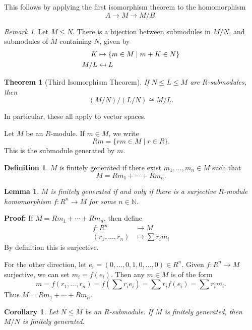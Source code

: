 \documentclass[12pt]{article}
\newtheorem{theorem}{Theorem}[section]
\newtheorem{corollary}{Corollary}[section]
\newtheorem{lemma}{Lemma}[section]
\theoremstyle{definition}
\newtheorem{definition}{Definition}[section]
\theoremstyle{remark}
\newtheorem*{remark}{Remark}
\newcommand{\mapsfrom}{\mathrel{\reflectbox{\ensuremath{\mapsto}}}}
\begin{document}
This follows by applying the first isomorphism theorem to the homomorphism
\[
A \to M \to M/B
.\]

\begin{remark}
	Let $M \leq N$. There is a bijection between submodules in $M/N$, and submodules of $M$ containing $N$, given by
	\begin{align*}
		K &\mapsto \{m \in M \mid m + K \in N\} \\
			M/L &\mapsfrom L
		\end{align*}
\end{remark}

\begin{theorem}[Third Isomorphism Theorem]
	If $N \leq L \leq M$ are $R$-submodules, then
	\[
		(M/N)/(L/N) \cong M/L
	.\]
\end{theorem}

In particular, these all apply to vector spaces.

Let $M$ be an $R$-module. If $m \in M$, we write
\[
	Rm = \{rm \in M \mid r \in R\}
.\]
This is the submodule generated by $m$.

\begin{definition}
	$M$ is finitely generated if there exist $m_1, \ldots, m_n \in M$ such that
	\[
	M = Rm_1 + \cdots + Rm_{n}
	.\]
\end{definition}

\begin{lemma}
	$M$ is finitely generated if and only if there is a surjective $R$-module homomorphism $f : R^{n} \to M$ for some $n \in \mathbb{N}$.
\end{lemma}

\begin{adjustbox}{minipage = \columnwidth - 25.5pt, margin=1em, frame=1pt, margin=0em}
\textbf{Proof:} If $M = Rm_1 + \cdots + Rm_n$, then define
\begin{align*}
	f : R^{n} &\to M \\
	(r_1, \ldots, r_n) &\mapsto \sum r_i m_i
\end{align*}
By definition this is surjective.

For the other direction, let $e_i = (0, \ldots, 0, 1, 0, \ldots, 0) \in R^{n}$. Given $f : R^{n} \to M$ surjective, we can set $m_i = f(e_i)$. Then any $m \in M$ is of the form
\[
	m = f(r_1, \ldots, r_n) = f( \sum r_i e_i) = \sum r_i f(e_i) = \sum r_i m_i
.\]
Thus $M = Rm_1 + \cdots + Rm_n$.
\end{adjustbox}

\begin{corollary}
	Let $N \leq M$ be an $R$-submodule. If $M$ is finitely generated, then $M/N$ is finitely generated.
\end{corollary}
\end{document}
